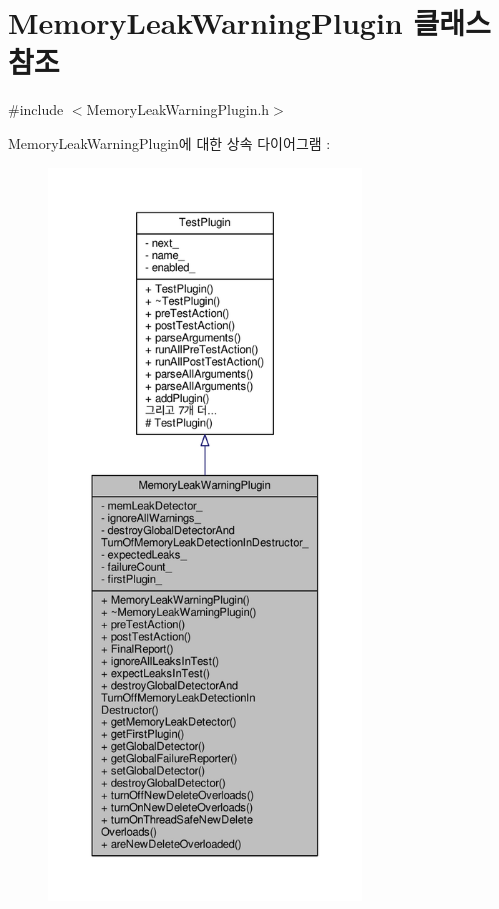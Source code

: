 \hypertarget{class_memory_leak_warning_plugin}{}\section{Memory\+Leak\+Warning\+Plugin 클래스 참조}
\label{class_memory_leak_warning_plugin}


{\ttfamily \#include $<$Memory\+Leak\+Warning\+Plugin.\+h$>$}



Memory\+Leak\+Warning\+Plugin에 대한 상속 다이어그램 \+: 
\nopagebreak
\begin{figure}[H]
\begin{center}
\leavevmode
\includegraphics[height=550pt]{class_memory_leak_warning_plugin__inherit__graph}
\end{center}
\end{figure}


